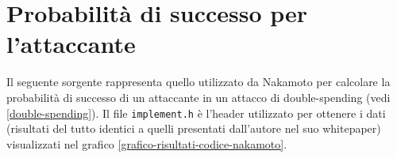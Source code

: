 \chapter{Probabilità di successo per l'attaccante}\label{src-prob-nakamoto}

Il seguente sorgente rappresenta quello utilizzato da Nakamoto per calcolare la probabilità di successo di un attaccante in un attacco di double-spending (vedi \ref{double-spending}). Il file \verb|implement.h| è l'header utilizzato per ottenere i dati (risultati del tutto identici a quelli presentati dall'autore nel suo whitepaper) visualizzati nel grafico \ref{grafico-risultati-codice-nakamoto}.


